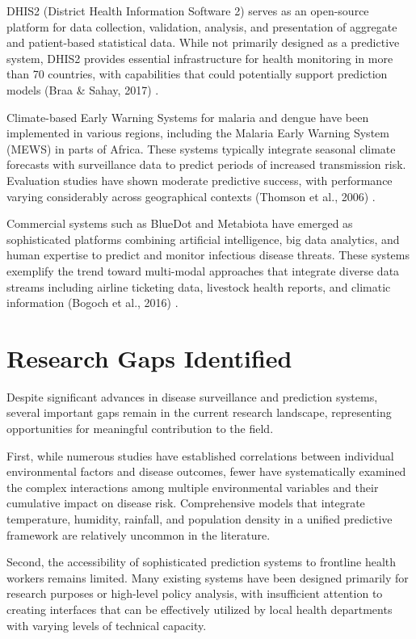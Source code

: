 \documentclass[12pt,a4paper]{report}
\begin{document}
DHIS2 (District Health Information Software 2) serves as an open-source platform for data collection, validation, analysis, and presentation of aggregate and patient-based statistical data. While not primarily designed as a predictive system, DHIS2 provides essential infrastructure for health monitoring in more than 70 countries, with capabilities that could potentially support prediction models (Braa & Sahay, 2017) \cite{braa2017participatory}.

Climate-based Early Warning Systems for malaria and dengue have been implemented in various regions, including the Malaria Early Warning System (MEWS) in parts of Africa. These systems typically integrate seasonal climate forecasts with surveillance data to predict periods of increased transmission risk. Evaluation studies have shown moderate predictive success, with performance varying considerably across geographical contexts (Thomson et al., 2006) \cite{thomson2006malaria}.

Commercial systems such as BlueDot and Metabiota have emerged as sophisticated platforms combining artificial intelligence, big data analytics, and human expertise to predict and monitor infectious disease threats. These systems exemplify the trend toward multi-modal approaches that integrate diverse data streams including airline ticketing data, livestock health reports, and climatic information (Bogoch et al., 2016) \cite{bogoch2016anticipating}.

\section{Research Gaps Identified}
Despite significant advances in disease surveillance and prediction systems, several important gaps remain in the current research landscape, representing opportunities for meaningful contribution to the field.

First, while numerous studies have established correlations between individual environmental factors and disease outcomes, fewer have systematically examined the complex interactions among multiple environmental variables and their cumulative impact on disease risk. Comprehensive models that integrate temperature, humidity, rainfall, and population density in a unified predictive framework are relatively uncommon in the literature.

Second, the accessibility of sophisticated prediction systems to frontline health workers remains limited. Many existing systems have been designed primarily for research purposes or high-level policy analysis, with insufficient attention to creating interfaces that can be effectively utilized by local health departments with varying levels of technical capacity.
\end{document}
